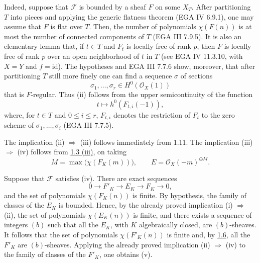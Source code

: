 Indeed, suppose that \(\mathcal F\) is bounded by a sheaf \(F\) on some
\(X_T\). After partitioning \(T\) into pieces and applying the generic
flatness theorem (EGA IV 6.9.1), one may assume that \(F\) is flat over
\(T\). Then,
the number of polynomials \(\chi(F(n))\) is at most the number of connected
components of \(T\) (EGA III 7.9.5). It is also an elementary lemma that,
if \(t\in T\) and \(F_t\) is locally free of rank \(p\), then \(F\) is
locally free of rank \(p\) over an open neighborhood of \(t\) in \(T\)
(see EGA IV 11.3.10, with \(X=Y\) and \(f=\mathrm{id}\)). The hypotheses
and EGA III 7.7.6 show, moreover, that after partitioning \(T\) still more
finely one can find a sequence \(\sigma\) of sections
\[
\sigma_1,\ldots,\sigma_r\in H^0(\mathcal O_X(1))
\]
that is \(F\)-regular. Thus (ii) follows from the upper semicontinuity of
the function
\[
t\longmapsto h^0(F_{t,i}(-1)),
\]
where, for \(t\in T\) and \(0\le i\le r\), \(F_{t,i}\) denotes the
restriction of \(F_t\) to the zero scheme of
\(\sigma_1,\ldots,\sigma_i\) (EGA III 7.7.5).

The implication (ii) \(\Rightarrow\) (iii) follows immediately from 1.11.
The implication (iii) \(\Rightarrow\) (iv) follows from \hyperlink{sga6.e13.prop.1-3}{1.3 (iii)}, on
taking
\[
M=\max\bigl(\chi(F_K(m))\bigr),
\qquad E=\mathcal O_X(-m)^{\oplus M}.
\]

Suppose that \(\mathcal F\) satisfies (iv). There are exact sequences
\[
0\longrightarrow F'_K\longrightarrow E_K\longrightarrow F_K
\longrightarrow0,
\]
and the set of polynomials \(\chi(F_K(n))\) is finite. By hypothesis, the
family of classes of the \(E_K\) is bounded. Hence, by the already proved
implication (i) \(\Rightarrow\) (ii), the set of polynomials
\(\chi(E_K(n))\) is finite, and there exists a sequence of integers \((b)\)
such that all the \(E_K\), with \(K\) algebraically closed, are
\((b)\)-sheaves. It follows that the set of polynomials
\(\chi(F'_K(n))\) is finite and, by \hyperlink{sga6.e13.prop.1-6}{1.6}, all the \(F'_K\) are
\((b)\)-sheaves. Applying the already proved implication (ii)
\(\Rightarrow\) (iv) to the family of classes of the \(F'_K\), one obtains
(v).

